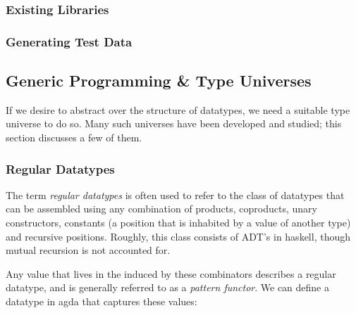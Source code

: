\documentclass[11pt]{article}
\begin{document}
\subsubsection{Existing Libraries}

\subsubsection{Generating Test Data}

\subsection{Generic Programming \& Type Universes}

If we desire to abstract over the structure of datatypes, we need a suitable type universe to do so. Many such universes have been developed and studied; this section discusses a few of them. 

\subsubsection{Regular Datatypes}

The term \textit{regular datatypes} is often used to refer to the class of datatypes that can be assembled using any combination of products, coproducts, unary constructors, constants (a position that is inhabited by a value of another type) and recursive positions. Roughly, this class consists of ADT's in haskell, though mutual recursion is not accounted for. 

Any value that lives in the induced by these combinators describes a regular datatype, and is generally referred to as a \textit{pattern functor}. We can define a datatype in agda that captures these values: 
\end{document}
